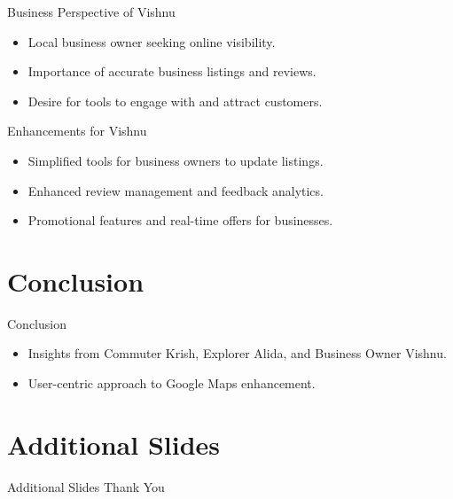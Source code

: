 \documentclass[10pt, aspectratio=149]{beamer}
\begin{document}
\begin{frame}{Business Perspective of Vishnu}
  \begin{itemize}
    \item Local business owner seeking online visibility.
    \item Importance of accurate business listings and reviews.
    \item Desire for tools to engage with and attract customers.
  \end{itemize}
\end{frame}

\begin{frame}{Enhancements for Vishnu}
  \begin{itemize}
    \item Simplified tools for business owners to update listings.
    \item Enhanced review management and feedback analytics.
    \item Promotional features and real-time offers for businesses.
  \end{itemize}
\end{frame}

\section{Conclusion}

\begin{frame}{Conclusion}
  \begin{itemize}
    \item Insights from Commuter Krish, Explorer Alida, and Business Owner Vishnu.
    \item User-centric approach to Google Maps enhancement.
  \end{itemize}
\end{frame}

\appendix
\section*{Additional Slides}

\begin{frame}{Additional Slides}
  Thank You
\end{frame}
\end{document}
